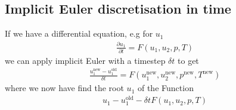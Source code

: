 \documentclass{article}
\begin{document}
 \subsection{Implicit Euler discretisation in time}
If we have a differential equation, e.g for $u_1$
\begin{align*}
	\frac{\partial u_1}{\partial t} = F(u_1,u_2,p,T)
\end{align*}
we can apply implicit Euler with a timestep $\delta t$ to get
\begin{align}
\label{Eulerscheme}
	\frac{u_1^\text{new}-u_1^\text{old}}{\delta t} = F(u_1^\text{new},u_2^\text{new},p^\text{new},T^\text{new})
\end{align}
where we now have find the root $u_1$ of the Function
\begin{align*}
u_1-u_1^\text{old} - \delta tF(u_1,u_2,p,T)
\end{align*}
\end{document}
